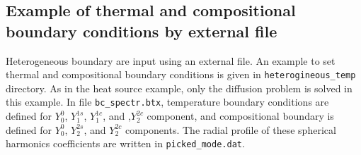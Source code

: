  \subsection{Example of thermal and compositional boundary conditions by external file}
 Heterogeneous boundary are input using an external file. An example to set thermal and compositional boundary conditions is given in \verb|heterogineous_temp| directory. As in the heat source example, only the diffusion problem is solved in this example. In file \verb|bc_spectr.btx|, temperature boundary conditions are defined for $Y_{0}^{0}$, $Y_{1}^{1s}$, $Y_{1}^{1c}$, and ,$ Y_{2}^{2c}$ component, and compositional boundary is defined for $Y_{0}^{0}$, $Y_{2}^{2s}$, and $Y_{2}^{2c}$ components. The radial profile of these spherical harmonics coefficients are written in \verb|picked_mode.dat|.


